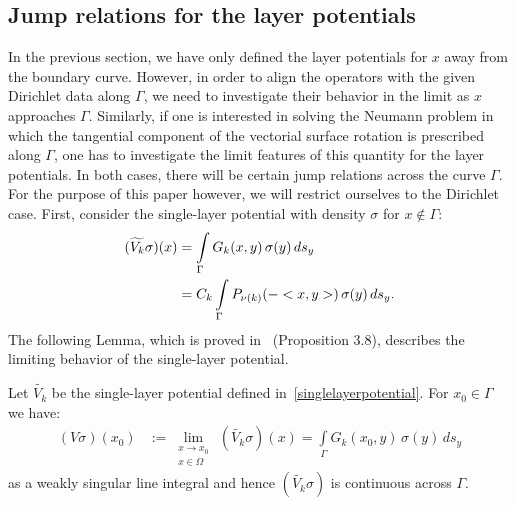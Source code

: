 \subsection{Jump relations for the layer potentials} 
In the previous section, we have only defined the layer potentials for
$x$ away from the boundary curve. However, in order to align the
operators with the given Dirichlet data along $\Gamma$, we need to
investigate their behavior in the limit as $x$ approaches $\Gamma$.
Similarly, if one is interested in solving the Neumann problem in which
the tangential component of the vectorial surface rotation is prescribed
along $\Gamma$, one has to investigate the limit features of this
quantity for the layer potentials. In both cases, there will be certain
jump relations across the curve $\Gamma$. For the purpose of this paper
however, we will restrict ourselves to the Dirichlet case.  First,
consider the single-layer potential with density $\sigma$ for $x \notin
\Gamma$:
\begin{align*}
  (\widetilde{V_k}\sigma)(x) & =  \int\limits_\Gamma
  G_k(x,y)\,\sigma(y)\,ds_{y} \\
  & = C_k \int\limits_\Gamma P_{\nu(k)}(-<x,y>)\,\sigma(y)\,ds_{y}.
\end{align*}
The following Lemma, which is proved in~\cite{mit:tay1999} (Proposition
3.8), describes the limiting behavior of the single-layer potential.
\begin{lemma}
Let $\widetilde{V_k}$ be the single-layer potential defined
in~\eqref{singlelayerpotential}. For $x_{0}\in\Gamma$ we have:
\begin{align*} 
  (V\sigma)(x_0) & := \lim\limits_{\substack{
      x \to x_{0} \\ x \in \Omega}}
  \,(\widetilde{V_k}\sigma)(x) = \int\limits_\Gamma G_k(x_{0},y)\,\sigma(y)\,ds_{y}
\end{align*}
as a weakly singular line integral and hence $(\widetilde{V_k}\sigma)$
is continuous across $\Gamma$.
\end{lemma}
%
